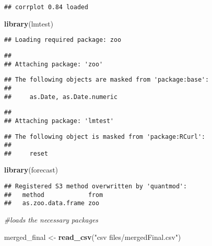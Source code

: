\documentclass[
]{article}
\newenvironment{Shaded}{\begin{snugshade}}{\end{snugshade}}
\newcommand{\CommentTok}[1]{\textcolor[rgb]{0.56,0.35,0.01}{\textit{#1}}}
\newcommand{\KeywordTok}[1]{\textcolor[rgb]{0.13,0.29,0.53}{\textbf{#1}}}
\newcommand{\NormalTok}[1]{#1}
\newcommand{\StringTok}[1]{\textcolor[rgb]{0.31,0.60,0.02}{#1}}
\begin{document}
\begin{verbatim}
## corrplot 0.84 loaded
\end{verbatim}

\begin{Shaded}
\begin{Highlighting}[]
\KeywordTok{library}\NormalTok{(lmtest)}
\end{Highlighting}
\end{Shaded}

\begin{verbatim}
## Loading required package: zoo
\end{verbatim}

\begin{verbatim}
## 
## Attaching package: 'zoo'
\end{verbatim}

\begin{verbatim}
## The following objects are masked from 'package:base':
## 
##     as.Date, as.Date.numeric
\end{verbatim}

\begin{verbatim}
## 
## Attaching package: 'lmtest'
\end{verbatim}

\begin{verbatim}
## The following object is masked from 'package:RCurl':
## 
##     reset
\end{verbatim}

\begin{Shaded}
\begin{Highlighting}[]
\KeywordTok{library}\NormalTok{(forecast)}
\end{Highlighting}
\end{Shaded}

\begin{verbatim}
## Registered S3 method overwritten by 'quantmod':
##   method            from
##   as.zoo.data.frame zoo
\end{verbatim}

\begin{Shaded}
\begin{Highlighting}[]
\CommentTok{#loads the necessary packages}
\end{Highlighting}
\end{Shaded}

\begin{Shaded}
\begin{Highlighting}[]
\NormalTok{ merged_final <-}\StringTok{ }\KeywordTok{read_csv}\NormalTok{(}\StringTok{"csv files/mergedFinal.csv"}\NormalTok{)}
\end{Highlighting}
\end{Shaded}
\end{document}

